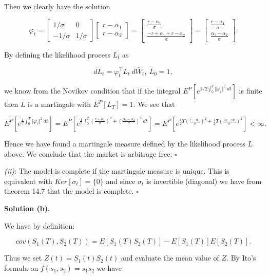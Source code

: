 \documentclass[
]{article}
\begin{document}
Then we clearly have the solution

\[
\varphi_t=
\begin{bmatrix}
1/\sigma & 0\\
-1/\sigma & 1/\sigma
\end{bmatrix}\begin{bmatrix}
r-\alpha_1\\
r-\alpha_2
\end{bmatrix}=
\begin{bmatrix}
\frac{r-\alpha_1}{\sigma}\\
\frac{-r+\alpha_1+r-\alpha_2}{\sigma}
\end{bmatrix}=\begin{bmatrix}
\frac{r-\alpha_1}{\sigma}\\
\frac{\alpha_1-\alpha_2}{\sigma}
\end{bmatrix}.
\]

By defining the likelihood process \(L_t\) as

\[
dL_t=\varphi_t^\top L_t\ d\overline{W}_t,\ L_0=1,
\]

we know from the Novikov condition that if the integral
\(E^P[e^{1/2\int_0^T\Vert \varphi_t\Vert^2\ dt}]\) is finite then \(L\)
is a martingale with \(E^P[L_T]=1\). We see that

\[
E^P\left[e^{\frac{1}{2}\int_0^T\Vert \varphi_t\Vert^2\ dt}\right]=E^P\left[e^{\frac{1}{2}\int_0^T \left(\frac{r-\alpha_1}{\sigma}\right)^2+\left(\frac{\alpha_1-\alpha_2}{\sigma}\right)^2\ dt}\right]=E^P\left[e^{\frac{1}{2}T \left(\frac{r-\alpha_1}{\sigma}\right)^2+\frac{1}{2}T\left(\frac{\alpha_1-\alpha_2}{\sigma}\right)^2}\right]<\infty.
\]

Hence we have found a martingale measure defined by the likelihood
process \(L\) above. We conclude that the market is arbitrage free.
\(\square\)

\emph{(ii)}: The model is complete if the martingale measure is unique.
This is equivalent with \(Ker[\sigma_t]=\{0\}\) and since \(\sigma_t\)
is invertible (diagonal) we have from theorem 14.7 that the model is
complete. \(\square\)

\textbf{Solution (b).}

We have by definition:

\[
cov(S_1(T),S_2(T))=E\left[S_1(T)S_2(T)\right]-E[S_1(T)]E[S_2(T)].
\]

Thus we set \(Z(t)=S_1(t)S_2(t)\) and evaluate the mean value of \(Z\).
By Ito's formula on \(f(s_1,s_2)=s_1s_2\) we have
\end{document}

